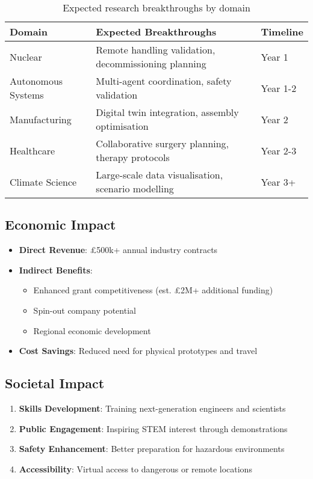 \begin{table}[H]
\centering
\begin{tabular}{@{}lp{8cm}l@{}}
\toprule
\textbf{Domain} & \textbf{Expected Breakthroughs} & \textbf{Timeline} \\
\midrule
Nuclear & Remote handling validation, decommissioning planning & Year 1 \\
Autonomous Systems & Multi-agent coordination, safety validation & Year 1-2 \\
Manufacturing & Digital twin integration, assembly optimisation & Year 2 \\
Healthcare & Collaborative surgery planning, therapy protocols & Year 2-3 \\
Climate Science & Large-scale data visualisation, scenario modelling & Year 3+ \\
\bottomrule
\end{tabular}
\caption{Expected research breakthroughs by domain}
\end{table}

\subsection{Economic Impact}

\begin{itemize}
    \item \textbf{Direct Revenue}: £500k+ annual industry contracts
    \item \textbf{Indirect Benefits}:
    \begin{itemize}
        \item Enhanced grant competitiveness (est. £2M+ additional funding)
        \item Spin-out company potential
        \item Regional economic development
    \end{itemize}
    \item \textbf{Cost Savings}: Reduced need for physical prototypes and travel
\end{itemize}

\subsection{Societal Impact}

\begin{enumerate}
    \item \textbf{Skills Development}: Training next-generation engineers and scientists
    \item \textbf{Public Engagement}: Inspiring STEM interest through demonstrations
    \item \textbf{Safety Enhancement}: Better preparation for hazardous environments
    \item \textbf{Accessibility}: Virtual access to dangerous or remote locations
\end{enumerate}

